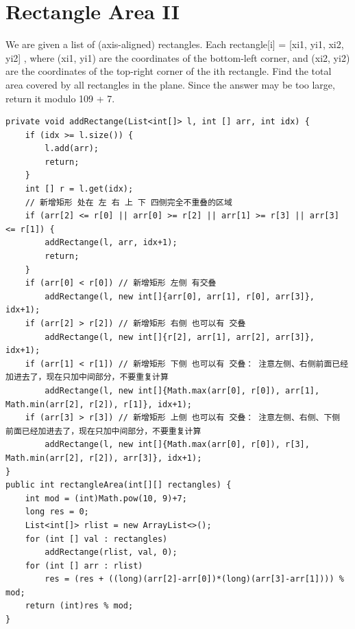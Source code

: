 \documentclass[9pt, b5paaper]{book}
\begin{document}
\section{Rectangle Area II}
\label{sec-22-2}
We are given a list of (axis-aligned) rectangles. Each rectangle[i] = [xi1, yi1, xi2, yi2] , where (xi1, yi1) are the coordinates of the bottom-left corner, and (xi2, yi2) are the coordinates of the top-right corner of the ith rectangle.
Find the total area covered by all rectangles in the plane. Since the answer may be too large, return it modulo 109 + 7.
\begin{verbatim}
private void addRectange(List<int[]> l, int [] arr, int idx) {
    if (idx >= l.size()) {
        l.add(arr);
        return;
    }
    int [] r = l.get(idx);
    // 新增矩形 处在 左 右 上 下 四侧完全不重叠的区域
    if (arr[2] <= r[0] || arr[0] >= r[2] || arr[1] >= r[3] || arr[3] <= r[1]) { 
        addRectange(l, arr, idx+1);
        return;
    }
    if (arr[0] < r[0]) // 新增矩形 左侧 有交叠
        addRectange(l, new int[]{arr[0], arr[1], r[0], arr[3]}, idx+1);
    if (arr[2] > r[2]) // 新增矩形 右侧 也可以有 交叠
        addRectange(l, new int[]{r[2], arr[1], arr[2], arr[3]}, idx+1);
    if (arr[1] < r[1]) // 新增矩形 下侧 也可以有 交叠： 注意左侧、右侧前面已经加进去了，现在只加中间部分，不要重复计算
        addRectange(l, new int[]{Math.max(arr[0], r[0]), arr[1], Math.min(arr[2], r[2]), r[1]}, idx+1);
    if (arr[3] > r[3]) // 新增矩形 上侧 也可以有 交叠： 注意左侧、右侧、下侧 前面已经加进去了，现在只加中间部分，不要重复计算
        addRectange(l, new int[]{Math.max(arr[0], r[0]), r[3], Math.min(arr[2], r[2]), arr[3]}, idx+1);
}
public int rectangleArea(int[][] rectangles) {
    int mod = (int)Math.pow(10, 9)+7;
    long res = 0;
    List<int[]> rlist = new ArrayList<>();
    for (int [] val : rectangles) 
        addRectange(rlist, val, 0);
    for (int [] arr : rlist) 
        res = (res + ((long)(arr[2]-arr[0])*(long)(arr[3]-arr[1]))) % mod;
    return (int)res % mod;
}
\end{verbatim}
\end{document}
